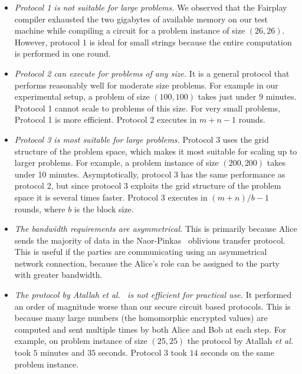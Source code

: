 \begin{itemize}
\item {\it Protocol 1 is not suitable for large problems.} We observed that
the Fairplay compiler exhausted the two gigabytes of available memory on our
test machine while compiling a circuit for a problem instance of
size $(26,26)$. However, protocol 1 is ideal for small strings because the
entire computation is performed in one round.

\item {\it Protocol 2 can execute for problems of any size.}  It is a general
protocol that performs reasonably well for moderate size problems.  For example 
in our experimental
setup, a problem of size $(100,100)$ takes just under $9$ minutes.  Protocol 1
cannot scale to problems of this size.  For very small problems, Protocol 1 is more efficient.
Protocol 2 executes in $m+n-1$ rounds.

\item {\it Protocol 3 is most suitable for large problems.}
Protocol 3 uses the grid structure of the problem space, which makes
it most suitable for scaling up to larger problems. For example, a problem instance
of size $(200,200)$ takes under 10 minutes. Asymptotically, protocol 3
has the same performance as protocol 2, but since protocol 3 exploits
the grid structure of the problem space it is several times
faster.  Protocol 3 executes in $(m+n)/b-1$ rounds, where $b$
is the block size.

\item {\it The bandwidth requirements are asymmetrical.}  
This is primarily because Alice sends
the majority of data in the Naor-Pinkas~\cite{Naor-Pinkas:2001} oblivious transfer protocol.
This is useful if the parties are communicating using an asymmetrical network
connection, because the Alice's role can be assigned to the party with greater
bandwidth.

\item {\it The protocol by Atallah \textit{et al.}~\cite{atallah} is not efficient for practical use.}
It performed an order of magnitude worse than our secure circuit based protocols.  This is because
many large numbers (the homomorphic encrypted values) are computed and sent multiple times
 by both Alice and Bob at each step. For example, on problem instance of size $(25,25)$ the protocol
by Atallah \textit{et al.} took $5$ minutes and $35$ seconds. Protocol $3$ took $14$ seconds on the same problem
instance.
\end{itemize}

